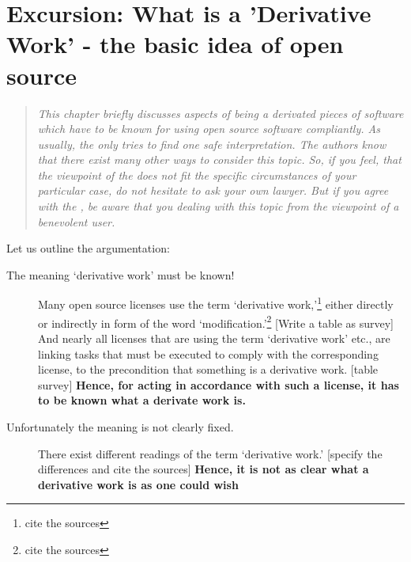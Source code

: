 {
\newcommand{\softbreak}{\hspace{0pt plus 1cm}}
\newcommand{\sourceNeeded}{\footnote{cite the sources}}

\section{Excursion: What is a 'Derivative Work' - the basic idea of open source}
\footnotesize \begin{quote}\itshape This chapter briefly discusses aspects of
being a derivated pieces of software which have to be known for using open
source software compliantly. As usually, the \oslic{}
only tries to find one safe interpretation. The authors know that there
exist many other ways to consider this topic. So, if you feel, that the
viewpoint of the \oslic{} does not fit the specific circumstances of your
particular case, do not hesitate to ask your own lawyer. But if you agree with
the \oslic{}, be aware that you dealing with this topic from the viewpoint of a
benevolent user.
\end{quote}
\normalsize
Let us outline the argumentation:

\begin{description}
  \item[The meaning `derivative work' must be known!]\softbreak
    Many open source licenses use the term `derivative work,'\sourceNeeded
    either directly or indirectly in form of the word `modification.'\sourceNeeded
    [Write a table as survey] 
    And nearly all licenses that are using the term `derivative work' etc., 
    are linking tasks that must be executed to comply with the corresponding
    license, to the precondition that something is a derivative work. 
    [table survey] 
    \textbf{Hence, for acting in accordance with such a license, it has to be
    known what a derivate work is.}  

  \item[Unfortunately the meaning is not clearly fixed.]\softbreak
    There exist different readings of the term `derivative work.' 
    [specify the differences and cite the sources] 
    \textbf{Hence, it is not as clear what a derivative work is as one could wish}


\end{description}}
